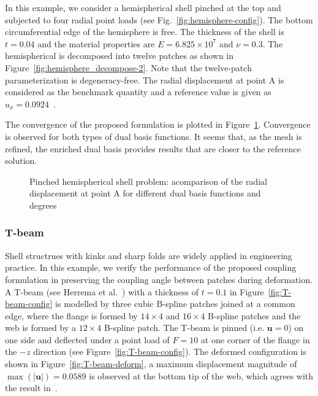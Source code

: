 In this example, we consider a hemispherical shell pinched at the top and subjected to four radial point loads (see Fig.~\ref{fig:hemisphere-config}). The bottom circumferential edge of the hemisphere is free. The thickness of the shell is $t = 0.04$ and the material properties are $E = 6.825\times{}10^7$ and $\nu = 0.3$. The hemispherical is decomposed into twelve patches as shown in Figure~\ref{fig:hemisphere_decompose-2}. Note that the twelve-patch parameterization is degeneracy-free. The radial displacement at point A is considered as the benchmark quantity and a reference value is given as $u_x = 0.0924$~\cite{kiendl2009isogeometric}.\par

The convergence of the proposed formulation is plotted in Figure~\ref{fig:hemisphere_result}. Convergence is observed for both types of dual basis functions. It seems that, as the mesh is refined, the enriched \Bezier dual basis provides results that are closer to the reference solution.  
\begin{figure}[h]
	\center
	
	\caption{ Pinched hemispherical shell problem: acomparison of the radial displacement at point A for different dual basis functions and degrees}
	\label{fig:hemisphere_result}
\end{figure}
\FloatBarrier
\subsubsection{T-beam}

Shell structrues with kinks and sharp folds are widely applied in engineering practice. In this example, we verify the performance of the proposed coupling formulation in preserving the coupling angle between patches during deformation. A T-beam (see Herrema et al.~\cite{herrema2019penalty}) with a thickness of $t=0.1$ in Figure~\ref{fig:T-beam-config} is modelled by three cubic B-spline patches joined at a common edge, where the flange is formed by $14\times 4$ and $ 16\times 4$ B-spline patches and the web is formed by a $12\times 4$ B-spline patch. The T-beam is pinned (i.e. $\mathbf{u}=0$) on one side and deflected under a point load of $F = 10$ at one corner of the flange in the $-z$ direction (see Figure~\ref{fig:T-beam-config}). The deformed configuration is shown in Figure~\ref{fig:T-beam-deform}, a maximum displacement magnitude of $\max(\vert \mathbf{u} \vert)=0.0589$ is observed at the bottom tip of the web, which agrees with the result in~\cite{herrema2019penalty}. \par

